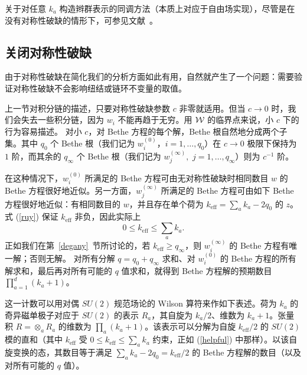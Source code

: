 关于对任意 $k_a$ 构造辫群表示的同调方法（本质上对应于自由场实现），尽管是在没有对称性破缺的情形下，可参见文献~\cite{Ltwo}。

\subsection{关闭对称性破缺}
由于对称性破缺在简化我们的分析方面如此有用，自然就产生了一个问题：需要验证对称性破缺不会影响纽结或链环不变量的取值。

上一节对积分链的描述，只要对称性破缺参数 $c$ 非零就适用。但当 $c\to 0$ 时，我们会失去一些积分链，因为 $w_i$ 不能再趋于无穷。用 ${\mathcal W}$ 的临界点来说，小 $c$ 下的行为容易描述。
对小 $c$，对 Bethe 方程的每个解，Bethe 根自然地分成两个子集。其中 $q_0$ 个 Bethe 根（我们记为 $w^{(0)}_i$，$i=1,\dots,q_0$）在 $c \to 0$ 极限下保持为 $1$ 阶，而其余的 $q_\infty$ 个 Bethe 根（我们记为 $w^{(\infty)}_j,$ $j=1,\dots,q_\infty$）则为 $c^{-1}$ 阶。

在这种情况下，$w^{(0)}_i$ 所满足的 Bethe 方程可由无对称性破缺时相同数目 $w$ 的 Bethe 方程很好地近似。另一方面，$w^{(\infty)}_j$ 所满足的 Bethe 方程可由如下 Bethe 方程很好地近似：有相同数目的 $w$，并且存在单个荷为 $k_{\mathrm{eff}}=\sum_a k_a - 2 q_0$ 的 $z$。式 (\ref{ruy}) 保证 $k_{\mathrm{eff}}$ 非负，因此实际上
 \begin{equation}\label{helpful}0\leq k_{\mathrm{eff}}\leq \sum_ak_a.\end{equation}
正如我们在第~\ref{degany}~节所讨论的，若 $k_{\mathrm{eff}}\geq q_\infty$，则 $w^{(\infty)}_i$ 的 Bethe 方程有唯一解；否则无解。
对所有分解 $q=q_0+q_\infty$ 求和、对 $w^{(0)}_i$ 的 Bethe 方程的所有解求和，最后再对所有可能的 $q$ 值求和，就得到 Bethe 方程解的预期数目 $\prod_{a=1}^d (k_a+1)$。


这一计数可以用对偶 $SU(2)$ 规范场论的 Wilson 算符来作如下表述。荷为 $k_a$ 的奇异磁单极子对应于 $SU(2)$ 的表示 $R_a$，其自旋为 $k_a/2$、维数为 $k_a+1$。张量积 $R=\otimes _a R_a$ 的维数为 $\prod_a(k_a+1)$。该表示可以分解为自旋 $k_{\mathrm {eff}}/2$ 的 $SU(2)$ 模的直和（其中 $k_{\mathrm{eff}}$ 受 $0\leq k_{\mathrm{eff}}\leq \sum_ak_a$ 约束，正如 (\ref{helpful}) 中那样）。以该自旋变换的态，其数目等于满足 $\sum_a k_a-2q_0=k_{\mathrm{eff}}/2$ 的 Bethe 方程解的数目（以及对所有可能的 $q$ 值）。

